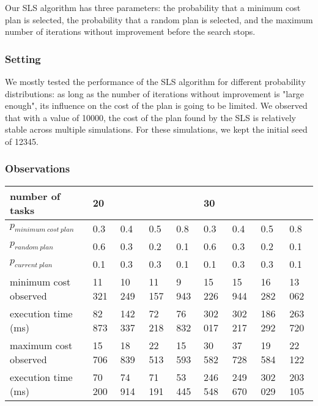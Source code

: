 \documentclass[10pt]{article}
\begin{document}
Our SLS algorithm has three parameters: the probability that a minimum cost plan is selected, the probability that a random plan is selected, and the maximum number of iterations without improvement before the search stops.

\subsubsection{Setting}
We mostly tested the performance of the SLS algorithm for different probability distributions: as long as the number of iterations without improvement is "large enough", its influence on the cost of the plan is going to be limited. We observed that with a value of 10000, the cost of the plan found by the SLS is relatively stable across multiple simulations.
For these simulations, we kept the initial seed of 12345.

\subsubsection{Observations}

\begin{tabular}{|l|llll|llll|}
\hline
number of tasks & 20 & & & & 30 & & & \\
\hline
$p_{minimum\ cost\ plan}$ & 0.3 & 0.4 & 0.5 & 0.8 & 0.3 & 0.4 & 0.5 & 0.8\\
$p_{random\ plan}$        & 0.6 & 0.3 & 0.2 & 0.1 & 0.6 & 0.3 & 0.2 & 0.1\\
$p_{current\ plan}$       & 0.1 & 0.3 & 0.3 & 0.1 & 0.1 & 0.3 & 0.3 & 0.1\\
\hline
minimum cost observed & 11 321 &  10 249 & 11 157 & 9 943  &  15 226 & 15 944 & 16 282 & 13 062 \\
execution time (ms)   & 82 873 & 142 337 & 72 218 & 76 832 & 302 017 & 302 217 & 186 292 & 263 720\\ 
\hline
maximum cost observed & 15 706 & 18 839 & 22 513 & 15 593  &  30 582 & 37 728 & 19 584 & 22 122\\
execution time (ms)   & 70 200 & 74 914 & 71 191 & 53 445  & 246 548 & 249 670 & 302 029 & 203 105\\
\hline
\end{tabular}
\label{table:model_parameters}
\end{document}
